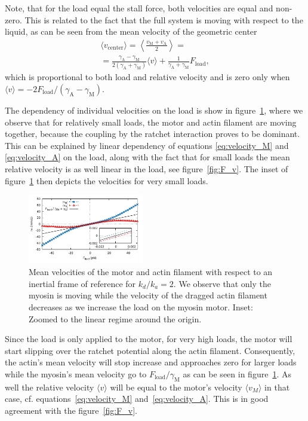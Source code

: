 \documentclass[aps,pre,twocolumn,showpacs,showkeys,superscriptaddress,floatfix]{revtex4-1}
\begin{document}
Note, that for the load equal the stall force, both velocities are equal and non-zero.
This is related to the fact that the full system is moving with respect to the liquid, as can be seen from the mean velocity of the geometric center 
\begin{multline*}
\langle v_\text{center} \rangle = \left\langle \frac{ v_\text{M} + v_\text{A} }{2} \right\rangle 
= \\
= \frac{ \gamma_\text{A} - \gamma_\text{M} }{ 2 ( \gamma_\text{A} + \gamma_\text{M} ) } \langle v \rangle + \frac{1}{ \gamma_\text{A} + \gamma_\text{M} } F_\text{load}
, 
\end{multline*}
which is proportional to both load and relative velocity and is zero only when $\langle v \rangle = - 2 F_\text{load} / ( \gamma_\text{A} - \gamma_\text{M} )$.

The dependency of individual velocities on the load is show in figure~\ref{fig:ind_v}, 
where we observe that for relatively small loads, the motor and actin filament are moving together, because the coupling by the ratchet interaction proves to be dominant. 
This can be explained by linear dependency of equations \eqref{eq:velocity_M} and \eqref{eq:velocity_A} on the load, 
along with the fact that for small loads the mean relative velocity is as well linear in the load, see figure~\ref{fig:F_v}. 
The inset of figure~\ref{fig:ind_v} then depicts the velocities for very small loads.
\begin{figure}[t]
\centering
\includegraphics[width=0.45\textwidth,height=!]{individual_velocities}
\caption{
\label{fig:ind_v} 
Mean velocities of the motor and actin filament with respect to an inertial frame of reference for $k_d/k_a = 2$.
We observe that only the myosin is moving while the velocity of the dragged actin filament decreases as we increase the load on the myosin motor.
Inset: Zoomed to the linear regime around the origin.
}
\end{figure}

Since the load is only applied to the motor, for very high loads, the motor will start slipping over the ratchet potential along the actin filament. 
Consequently, the actin's mean velocity will stop increase and approaches zero for larger loads 
while the myosin's mean velocity go to $F_\text{load}/\gamma_\text{M}$ as can be seen in figure~\ref{fig:ind_v}. 
As well the relative velocity $\langle v \rangle$ will be equal to the motor's velocity $\langle v_M \rangle$ in that case, 
cf. equations~\eqref{eq:velocity_M} and~\eqref{eq:velocity_A}.
This is in good agreement with the figure~\ref{fig:F_v}.
\end{document}
